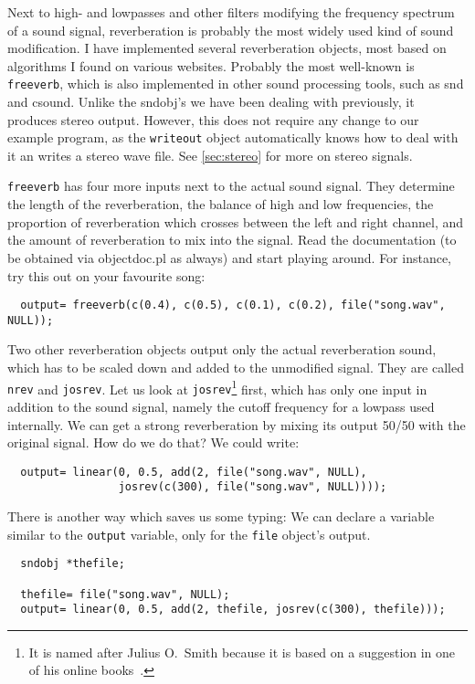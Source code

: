 \documentclass{article}
\def\bv{\begin{verbatim}}
\begin{document}
Next to high- and lowpasses and other filters modifying the frequency spectrum
of a sound signal, reverberation is probably the most widely used kind of
sound modification.  I have implemented several reverberation objects, most
based on algorithms I found on various websites.  Probably the most well-known
is {\tt freeverb}, which is also implemented in other sound processing tools,
such as snd and csound.  Unlike the sndobj's we have been dealing with
previously, it produces stereo output.  However, this does not require any
change to our example program, as the {\tt writeout} object automatically knows
how to deal with it an writes a stereo wave file.  See \autoref{sec:stereo} for
more on stereo signals.

{\tt freeverb} has four more inputs next to the actual sound signal.  They
determine the length of the reverberation, the balance of high and low
frequencies, the proportion of reverberation which crosses between the left and
right channel, and the amount of reverberation to mix into the signal.  Read
the documentation (to be obtained via objectdoc.pl as always) and start playing
around.  For instance, try this out on your favourite song:

\bv
  output= freeverb(c(0.4), c(0.5), c(0.1), c(0.2), file("song.wav", NULL));
\end{verbatim}

Two other reverberation objects output only the actual reverberation sound,
which has to be scaled down and added to the unmodified signal.  They are
called {\tt nrev} and {\tt josrev}.  Let us look at {\tt josrev}\footnote{It is
named after Julius O.\ Smith because it is based on a suggestion in one of his
online books~\cite{jos}.} first, which has only one input in addition to the
sound signal, namely the cutoff frequency for a lowpass used internally.  We
can get a strong reverberation by mixing its output 50/50 with the original
signal.  How do we do that?  We could write:

\bv
  output= linear(0, 0.5, add(2, file("song.wav", NULL),
                 josrev(c(300), file("song.wav", NULL))));
\end{verbatim}

There is another way which saves us some typing: We can declare a variable
similar to the {\tt output} variable, only for the {\tt file} object's output.

\bv
  sndobj *thefile;

  thefile= file("song.wav", NULL);
  output= linear(0, 0.5, add(2, thefile, josrev(c(300), thefile)));
\end{verbatim}
\end{document}
